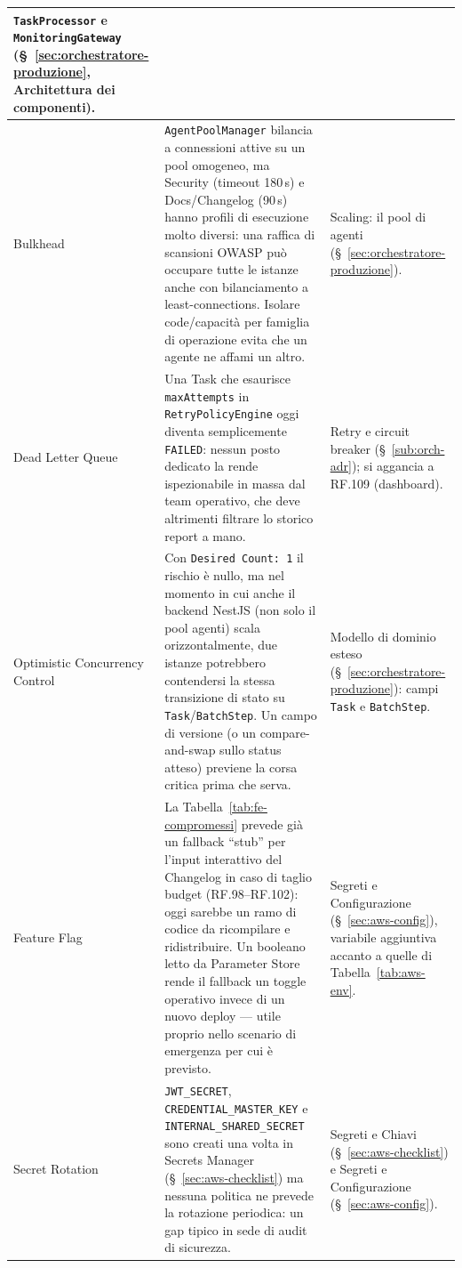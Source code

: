 \documentclass[11pt,a4paper]{article}
\begin{document}
\begin{center}
\begin{xltabular}{\textwidth}{|l|X|X|}
\texttt{TaskProcessor} e \texttt{MonitoringGateway} (\S~\ref{sec:orchestratore-produzione}, Architettura dei componenti). \\ \hline
Bulkhead &
\texttt{AgentPoolManager} bilancia a connessioni attive su un pool omogeneo, ma Security (timeout 180\,s) e Docs/Changelog (90\,s) hanno profili di esecuzione molto diversi: una raffica di scansioni OWASP può occupare tutte le istanze anche con bilanciamento a least-connections. Isolare code/capacità per famiglia di operazione evita che un agente ne affami un altro. &
Scaling: il pool di agenti (\S~\ref{sec:orchestratore-produzione}). \\ \hline
Dead Letter Queue &
Una Task che esaurisce \texttt{maxAttempts} in \texttt{RetryPolicyEngine} oggi diventa semplicemente \texttt{FAILED}: nessun posto dedicato la rende ispezionabile in massa dal team operativo, che deve altrimenti filtrare lo storico report a mano. &
Retry e circuit breaker (\S~\ref{sub:orch-adr}); si aggancia a RF.109 (dashboard). \\ \hline
Optimistic Concurrency Control &
Con \texttt{Desired Count: 1} il rischio è nullo, ma nel momento in cui anche il backend NestJS (non solo il pool agenti) scala orizzontalmente, due istanze potrebbero contendersi la stessa transizione di stato su \texttt{Task}/\texttt{BatchStep}. Un campo di versione (o un compare-and-swap sullo status atteso) previene la corsa critica prima che serva. &
Modello di dominio esteso (\S~\ref{sec:orchestratore-produzione}): campi \texttt{Task} e \texttt{BatchStep}. \\ \hline
Feature Flag &
La Tabella~\ref{tab:fe-compromessi} prevede già un fallback ``stub'' per l'input interattivo del Changelog in caso di taglio budget (RF.98--RF.102): oggi sarebbe un ramo di codice da ricompilare e ridistribuire. Un booleano letto da Parameter Store rende il fallback un toggle operativo invece di un nuovo deploy --- utile proprio nello scenario di emergenza per cui è previsto. &
Segreti e Configurazione (\S~\ref{sec:aws-config}), variabile aggiuntiva accanto a quelle di Tabella~\ref{tab:aws-env}. \\ \hline
Secret Rotation &
\texttt{JWT\_SECRET}, \texttt{CREDENTIAL\_MASTER\_KEY} e \texttt{INTERNAL\_SHARED\_SECRET} sono creati una volta in Secrets Manager (\S~\ref{sec:aws-checklist}) ma nessuna politica ne prevede la rotazione periodica: un gap tipico in sede di audit di sicurezza. &
Segreti e Chiavi (\S~\ref{sec:aws-checklist}) e Segreti e Configurazione (\S~\ref{sec:aws-config}). \\ \hline
\end{xltabular}
\end{center}
\end{document}
